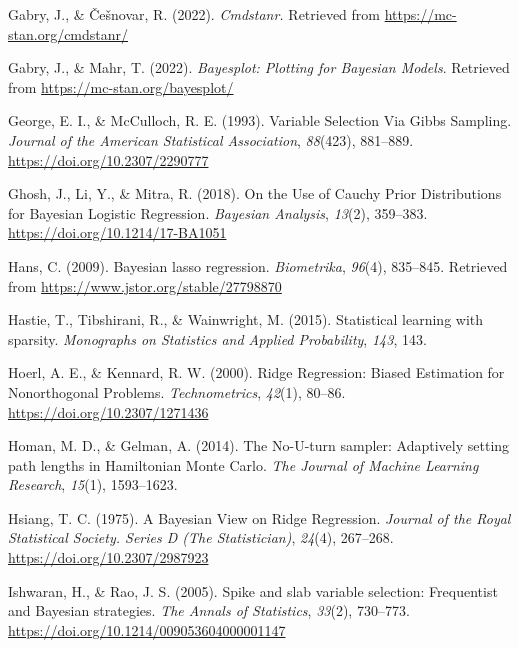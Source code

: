 \documentclass[
  man, donotrepeattitle,floatsintext]{apa6}
\newlength{\cslhangindent}
\newlength{\cslentryspacingunit} %
\newenvironment{CSLReferences}[2] %
 {%
  \setlength{\parindent}{0pt}
  \ifodd #1
  \let\oldpar\par
  \def\par{\hangindent=\cslhangindent\oldpar}
  \fi
  \setlength{\parskip}{#2\cslentryspacingunit}
 }%
 {}
\begin{document}
\begin{CSLReferences}{1}{0}
\leavevmode{}%
Gabry, J., \& Češnovar, R. (2022). \emph{Cmdstanr.} Retrieved from \url{https://mc-stan.org/cmdstanr/}

\leavevmode{}%
Gabry, J., \& Mahr, T. (2022). \emph{Bayesplot: {Plotting} for {Bayesian} {Models}}. Retrieved from \url{https://mc-stan.org/bayesplot/}

\leavevmode{}%
George, E. I., \& McCulloch, R. E. (1993). Variable {Selection} {Via} {Gibbs} {Sampling}. \emph{Journal of the American Statistical Association}, \emph{88}(423), 881--889. \url{https://doi.org/10.2307/2290777}

\leavevmode{}%
Ghosh, J., Li, Y., \& Mitra, R. (2018). On the {Use} of {Cauchy} {Prior} {Distributions} for {Bayesian} {Logistic} {Regression}. \emph{Bayesian Analysis}, \emph{13}(2), 359--383. \url{https://doi.org/10.1214/17-BA1051}

\leavevmode{}%
Hans, C. (2009). Bayesian lasso regression. \emph{Biometrika}, \emph{96}(4), 835--845. Retrieved from \url{https://www.jstor.org/stable/27798870}

\leavevmode{}%
Hastie, T., Tibshirani, R., \& Wainwright, M. (2015). Statistical learning with sparsity. \emph{Monographs on Statistics and Applied Probability}, \emph{143}, 143.

\leavevmode{}%
Hoerl, A. E., \& Kennard, R. W. (2000). Ridge {Regression}: {Biased} {Estimation} for {Nonorthogonal} {Problems}. \emph{Technometrics}, \emph{42}(1), 80--86. \url{https://doi.org/10.2307/1271436}

\leavevmode{}%
Homan, M. D., \& Gelman, A. (2014). The {No}-{U}-turn sampler: Adaptively setting path lengths in {Hamiltonian} {Monte} {Carlo}. \emph{The Journal of Machine Learning Research}, \emph{15}(1), 1593--1623.

\leavevmode{}%
Hsiang, T. C. (1975). A {Bayesian} {View} on {Ridge} {Regression}. \emph{Journal of the Royal Statistical Society. Series D (The Statistician)}, \emph{24}(4), 267--268. \url{https://doi.org/10.2307/2987923}

\leavevmode{}%
Ishwaran, H., \& Rao, J. S. (2005). Spike and slab variable selection: {Frequentist} and {Bayesian} strategies. \emph{The Annals of Statistics}, \emph{33}(2), 730--773. \url{https://doi.org/10.1214/009053604000001147}


\end{CSLReferences}
\end{document}
